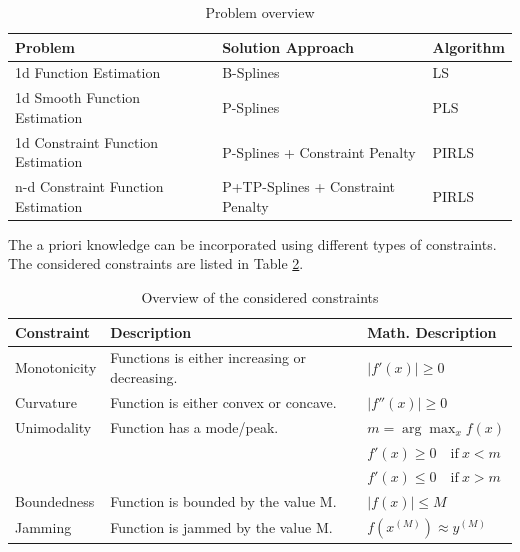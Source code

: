 \documentclass[10pt,a4paper]{report}
\begin{document}
\begin{table}[H]
	\centering
	\begin{tabular}{|lll|}
		\hline
		\textbf{Problem}                   & \textbf{Solution Approach}           & \textbf{Algorithm}  \\ \hline \toprule
		1d Function Estimation             & B-Splines                            & LS                  \\ \hline
		1d Smooth Function Estimation      & P-Splines                            & PLS                 \\ \hline
		1d Constraint Function Estimation  & P-Splines + Constraint Penalty       & PIRLS 			    \\ \hline 
		n-d Constraint Function Estimation & P+TP-Splines + Constraint Penalty & PIRLS 			    \\ \hline \bottomrule
	\end{tabular}
	\caption{Problem overview}
	\label{tab:problem_overview}
\end{table}

The a priori knowledge can be incorporated using different types of constraints. The considered constraints are listed in Table \ref{tab:constraint_overview}.

\begin{table}[h]
	\centering
	\begin{tabular}{|lll|}
		\hline
		\textbf{Constraint}& \textbf{Description}                         & \textbf{Math. Description}\\ \hline \toprule
		Monotonicity       & Functions is either increasing or decreasing.& $\lvert f'(x) \rvert \ge 0$ 	\\ \hline
		Curvature          & Function is either convex or concave.        & $\lvert f''(x) \rvert \ge 0$ 	\\ \hline
		Unimodality        & Function has a mode/peak.                    & $m = \arg \max_{x} f(x)$ 				\\ 
		&	   										  & $f'(x) \ge 0 \quad \text{if} \ x < m$  \\ 
		&  											  & $f'(x) \le 0 \quad \text{if} \ x > m$  \\ \hline
		Boundedness        & Function is bounded by the value M.          & $\lvert f(x)\rvert \le M$ 		\\ \hline
		Jamming            & Function is jammed by the value M.           & $f(x^{(M)}) \approx y^{(M)}$	\\ \hline \bottomrule
	\end{tabular}
	\caption{Overview of the considered constraints}
	\label{tab:constraint_overview}
\end{table}
\end{document}
